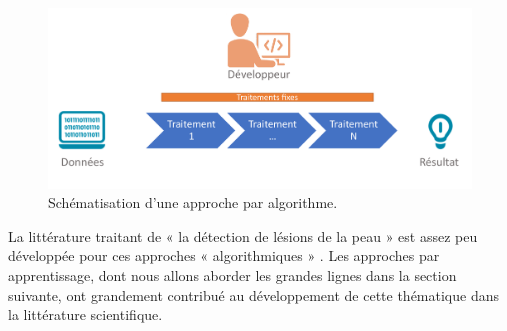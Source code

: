 \begin{figure}[H]
    \centering
    \includegraphics[width=\linewidth]{contents/chapter_3/resources/StandardProcess.pdf}
    \caption{Schématisation d’une approche par algorithme.}
    \label{fig:chapter_3:standard}
\end{figure}
La littérature traitant de « la détection de lésions de la peau » est assez peu développée pour ces approches « algorithmiques » \cite{Moss1989}. Les approches par apprentissage, dont nous allons aborder les grandes lignes dans la section suivante, ont grandement contribué au développement de cette thématique dans la littérature scientifique.\par

